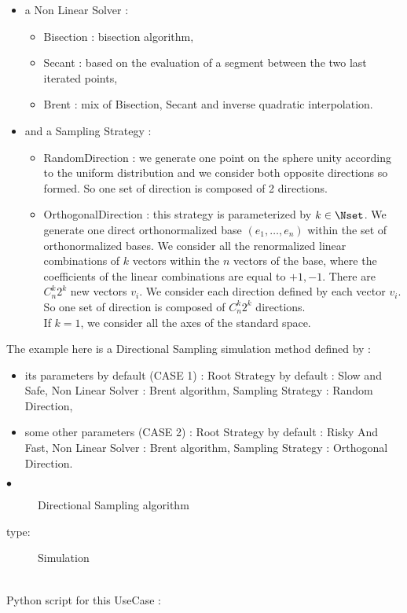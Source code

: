 \begin{itemize}
\item a Non Linear Solver :
  \begin{itemize}
  \item Bisection : bisection algorithm,
  \item Secant : based on the evaluation of a segment between the two last iterated points,
  \item Brent : mix of Bisection, Secant and inverse quadratic interpolation.
  \end{itemize}

\item and a Sampling Strategy :
  \begin{itemize}
  \item RandomDirection : we generate one point on the sphere unity according to the uniform distribution and we consider both opposite directions so formed. So one set of direction is composed of 2 directions.
  \item OrthogonalDirection : this strategy is parameterized by $k\in \Nset$. We generate one direct orthonormalized base $(e_1, \dots, e_n)$ within the set of orthonormalized bases. We consider all the renormalized linear combinations of $k$ vectors within the $n$ vectors of the base, where the coefficients of the linear combinations are equal to ${+1, -1}$. There are $C_n^k 2^k$ new vectors $v_i$. We consider each direction defined by each vector $v_i$. So one set of direction is composed of $C_n^k 2^k$ directions.\\
    If $k=1$, we consider all the axes of the standard space.
  \end{itemize}
\end{itemize}


The example here is a Directional Sampling simulation method defined by :
\begin{itemize}
\item its parameters by default (CASE 1) :  Root Strategy by default : Slow and Safe, Non Linear Solver : Brent algorithm, Sampling Strategy : Random Direction,
\item some other parameters (CASE 2) :  Root Strategy by default : Risky And Fast, Non Linear Solver : Brent algorithm, Sampling Strategy : Orthogonal Direction.
\end{itemize}
\vspace*{0.2cm}

             {
               \begin{description}
               \item[$\bullet$] Directional Sampling algorithm
               \item[type:] Simulation
               \end{description}
             }

             \textspace\\
             Python  script for this UseCase :

